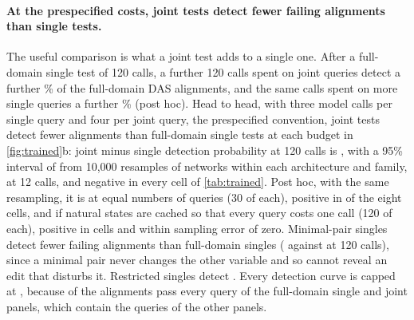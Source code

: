 \paragraph{At the prespecified costs, joint tests detect fewer failing alignments than single tests.}
The useful comparison is what a joint test adds to a single one. After a full-domain single test of 120 calls, a
further 120 calls spent on joint queries detect a further \TrnAddonJoint\% of the \TrnDas{} full-domain DAS
alignments, and the same calls spent on more single queries a further \TrnAddonSingle\% (post hoc). Head to head,
with three model calls per single query and four per joint query, the prespecified convention, joint tests detect
fewer alignments than full-domain single tests at each budget in \cref{fig:trained}b: joint minus single detection
probability at 120 calls is \TrnContrastOneTwenty, with a 95\% interval of \TrnContrastOneTwentyCI{} from 10,000
resamples of networks within each architecture and family, \TrnContrastTwelve{} at 12 calls, and negative in every
cell of \cref{tab:trained}. Post hoc, with the same resampling, it is \TrnEqualQueries{} \TrnEqualQueriesCI{} at equal
numbers of queries (30 of each), positive in \TrnEqualPositiveCells{} of the eight cells, and \TrnCached{}
\TrnCachedCI{} if natural states are cached so that every query costs one call (120 of each), positive in
\TrnCachedPositiveCells{} cells and within sampling error of zero. Minimal-pair
singles detect fewer failing alignments than full-domain singles (\TrnDetectMinimalOneTwenty{} against
\TrnDetectSingleOneTwenty{} at 120 calls), since a minimal pair never changes the other variable and so cannot reveal
an edit that disturbs it. Restricted singles detect \TrnDetectRestrictedOneTwenty. Every detection curve is capped at
\TrnCeiling, because \TrnNeverFail{} of the \TrnDas{} alignments pass every query of the full-domain single and joint
panels, which contain the queries of the other panels.

